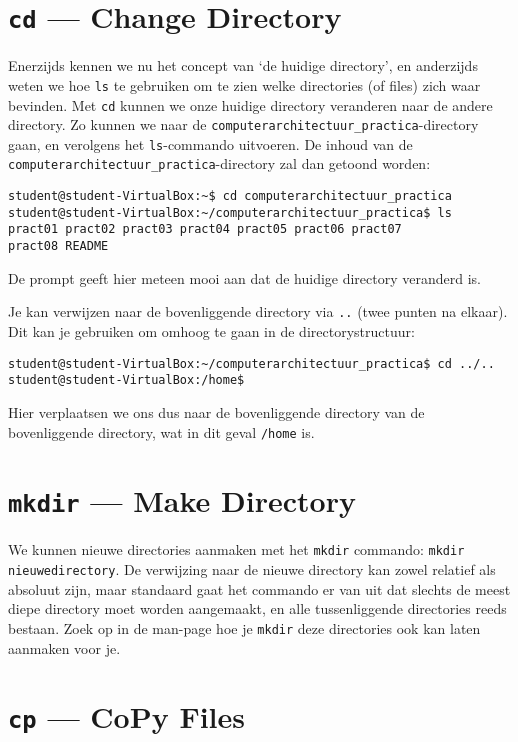 \documentclass[a4paper,twoside,openany]{memoir}
\begin{document}
\section{\texttt{cd} --- Change Directory}

Enerzijds kennen we nu het concept van `de huidige directory', en anderzijds
weten we hoe \verb!ls! te gebruiken om te zien welke directories (of files) zich
waar bevinden. Met \verb!cd! kunnen we onze huidige directory veranderen naar de
andere directory. Zo kunnen we naar de
\verb!computerarchitectuur_practica!-directory gaan, en verolgens het
\verb!ls!-commando uitvoeren. De inhoud van de
\verb!computerarchitectuur_practica!-directory zal dan getoond worden:

\begin{verbatim}
student@student-VirtualBox:~$ cd computerarchitectuur_practica
student@student-VirtualBox:~/computerarchitectuur_practica$ ls
pract01 pract02 pract03 pract04 pract05 pract06 pract07
pract08 README
\end{verbatim}

De prompt geeft hier meteen mooi aan dat de huidige directory veranderd is.

Je kan verwijzen naar de bovenliggende directory via \verb!..! (twee
punten na elkaar). Dit kan je gebruiken om omhoog te gaan in de
directorystructuur:
\begin{verbatim}
student@student-VirtualBox:~/computerarchitectuur_practica$ cd ../..
student@student-VirtualBox:/home$ 
\end{verbatim}

Hier verplaatsen we ons dus naar de bovenliggende directory van de bovenliggende
directory, wat in dit geval \verb!/home! is.

\section{\texttt{mkdir} --- Make Directory}

We kunnen nieuwe directories aanmaken met het \verb!mkdir! commando: \verb!mkdir nieuwedirectory!. De verwijzing naar de nieuwe directory kan zowel relatief als
absoluut zijn, maar standaard gaat het commando er van uit dat slechts de meest
diepe directory moet worden aangemaakt, en alle tussenliggende directories reeds
bestaan. Zoek op in de man-page hoe je \verb!mkdir! deze directories ook kan
laten aanmaken voor je.

\section{\texttt{cp} --- CoPy Files}
\end{document}
